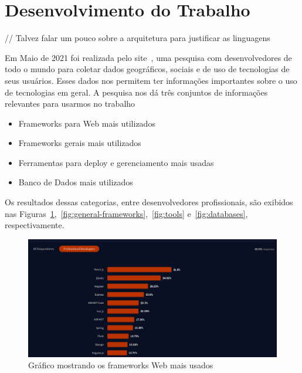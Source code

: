 \documentclass[12pt]{article}
\begin{document}
\section{Desenvolvimento do Trabalho}

// Talvez falar um pouco sobre a arquitetura para justificar as linguagens

Em Maio de 2021 foi realizada pelo site~\cite{stack11}, uma pesquisa com desenvolvedores de todo o mundo para
coletar dados geográficos, sociais e de uso de tecnologias de seus usuários. Esses dados nos permitem ter
informações importantes sobre o uso de tecnologias em geral. A pesquisa nos dá três conjuntos
de informações relevantes para usarmos no trabalho

\begin{itemize}
  \item Frameworks para Web mais utilizados
  \item Frameworks gerais mais utilizados
  \item Ferramentas para deploy e gerenciamento mais usadas
  \item Banco de Dados mais utilizados
\end{itemize}

Os resultados dessas categorias, entre desenvolvedores profissionais, são exibidos nas
Figuras~\ref{fig:web-frameworks},~\ref{fig:general-frameworks},~\ref{fig:tools} e~\ref{fig:databases}, respectivamente.

\begin{figure}[H]
  \centering
  \includegraphics[width=1\textwidth]{web_frameworks_usage.png}
  \caption{Gráfico mostrando os frameworks Web mais usados}\label{fig:web-frameworks}
\end{figure}
\end{document}
